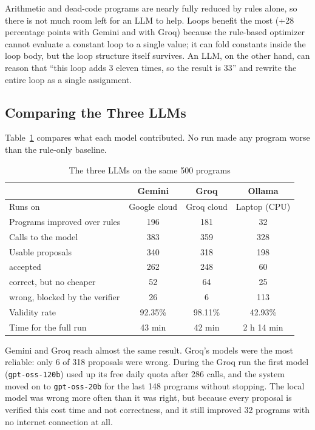\documentclass[12pt,a4paper]{report}
\begin{document}
Arithmetic and dead-code programs are nearly fully reduced by rules alone, so there is not much room left for an LLM to help. Loops benefit the most (+28 percentage points with Gemini and with Groq) because the rule-based optimizer cannot evaluate a constant loop to a single value; it can fold constants inside the loop body, but the loop structure itself survives. An LLM, on the other hand, can reason that ``this loop adds 3 eleven times, so the result is 33'' and rewrite the entire loop as a single assignment.

\subsection{Comparing the Three LLMs}

Table~\ref{tab:llms} compares what each model contributed. No run made any program worse than the rule-only baseline.

\begin{table}[H]
\centering
\caption{The three LLMs on the same 500 programs}
\label{tab:llms}
\small
\begin{tabular}{|l|c|c|c|}
\hline
 & \textbf{Gemini} & \textbf{Groq} & \textbf{Ollama} \\
\hline
Runs on & Google cloud & Groq cloud & Laptop (CPU) \\
\hline
Programs improved over rules & 196 & 181 & 32 \\
\hline
Calls to the model & 383 & 359 & 328 \\
\hline
Usable proposals & 340 & 318 & 198 \\
\hline
\quad accepted & 262 & 248 & 60 \\
\hline
\quad correct, but no cheaper & 52 & 64 & 25 \\
\hline
\quad wrong, blocked by the verifier & 26 & 6 & 113 \\
\hline
Validity rate & 92.35\% & 98.11\% & 42.93\% \\
\hline
Time for the full run & 43 min & 42 min & 2 h 14 min \\
\hline
\end{tabular}
\end{table}

Gemini and Groq reach almost the same result. Groq's models were the most reliable: only 6 of 318 proposals were wrong. During the Groq run the first model (\texttt{gpt-oss-120b}) used up its free daily quota after 286 calls, and the system moved on to \texttt{gpt-oss-20b} for the last 148 programs without stopping. The local model was wrong more often than it was right, but because every proposal is verified this cost time and not correctness, and it still improved 32 programs with no internet connection at all.
\end{document}
